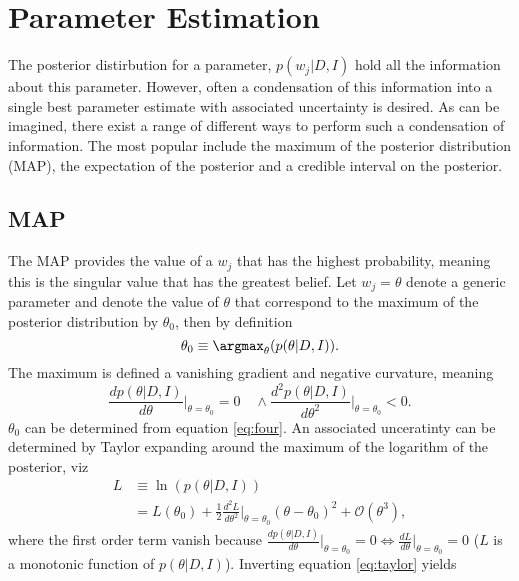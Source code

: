 \section{Parameter Estimation}
The posterior distirbution for a parameter, $p(w_j|D,I)$ hold all the information about this parameter. However, often a condensation of this information into a single best parameter estimate with associated uncertainty is desired. As can be imagined, there exist a range of different ways to perform such a condensation of information. The most popular include the maximum of the posterior distribution (MAP), the expectation of the posterior and a credible interval on the posterior.

\subsection{MAP}
The MAP provides the value of a $w_j$ that has the highest probability, meaning this is the singular value that has the greatest belief. Let $w_j=\theta$  denote a generic parameter and denote the value of $\theta$ that correspond to the maximum of the posterior distribution by $\theta_0$, then by definition
\begin{equation}
	\theta_0 \equiv \argmax_{\theta}(p(\theta|D,I)).
\end{equation}
The maximum is defined a vanishing gradient and negative curvature, meaning
\begin{equation}
	\frac{d p(\theta|D,I)}{d\theta}\bigg|_{\theta = \theta_0} = 0 \quad \wedge \frac{d^2 p(\theta|D,I)}{d\theta^2}\bigg|_{\theta = \theta_0} < 0.
	\label{eq:four}
\end{equation}
$\theta_0$ can be determined from equation \eqref{eq:four}. An associated unceratinty can be determined by Taylor expanding around the maximum of the logarithm of the posterior, viz 
\begin{equation}
	\begin{split}
		L &\equiv \ln(p(\theta|D,I))\\
		&= L(\theta_0) + \frac{1}{2}\frac{d^2L}{d\theta^2}\bigg|_{\theta=\theta_0}(\theta-\theta_0)^2+\mathcal{O}(\theta^3),
	\end{split}
	\label{eq:taylor}
\end{equation}
where the first order term vanish because $\frac{d p(\theta|D,I)}{d\theta}\big|_{\theta = \theta_0} = 0 \Leftrightarrow \frac{dL}{d\theta}\big|_{\theta = \theta_0} = 0$ ($L$ is a monotonic function of $p(\theta|D,I)$). Inverting equation \eqref{eq:taylor} yields
